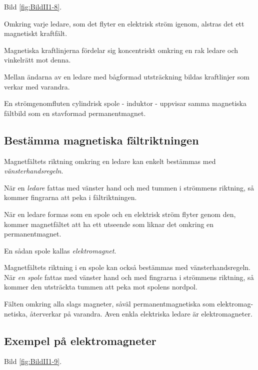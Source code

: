 Bild \ref{fig:BildII1-8}.

Omkring varje ledare, som det flyter en elektrisk ström igenom, alstras det ett
magnetiskt kraftfält.

Magnetiska kraftlinjerna fördelar sig koncentriskt omkring en rak ledare och
vinkelrätt mot denna.

Mellan ändarna av en ledare med bågformad utsträckning bildas kraftlinjer som
verkar med varandra.

En strömgenomfluten cylindrisk spole - induktor - uppvisar samma magnetiska
fältbild som en stavformad permanentmagnet.

\subsection{Bestämma magnetiska fältriktningen}

Magnetfältets riktning omkring en ledare kan enkelt bestämmas med
\emph{vänsterhandsregeln}.

När en \emph{ledare} fattas med vänster hand och med tummen i strömmens
riktning, så kommer fingrarna att peka i fältriktningen.

När en ledare formas som en spole och en elektrisk ström flyter genom den,
kommer magnetfältet att ha ett utseende som liknar det omkring en
permanentmagnet.

En sådan spole kallas \emph{elektromagnet}.

Magnetfältets riktning i en spole kan också bestämmas med vänsterhandsregeln.
När \emph{en spole} fattas med vänster hand och med fingrarna i strömmens
riktning, så kommer den utsträckta tummen att peka mot spolens nordpol.

Fälten omkring alla slags magneter, såväl permanentmagnetiska som elektromag-
netiska, återverkar på varandra. Aven enkla
elektriska ledare är elektromagneter.

\subsection{Exempel på elektromagneter}

Bild \ref{fig:BildII1-9}.

